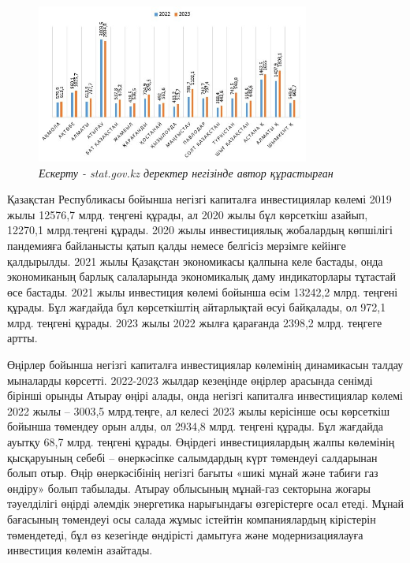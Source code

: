 \begin{figure}[H]
	\centering
	\includegraphics[width=0.8\textwidth]{media/ekon/image1.3}
	\caption*{2 -- сурет. 2022-2023 жж. ҚР өңірлері бойынша негізгі капиталға
	инвестициялар көлемінің серпіні, млрд. теңге}
	\caption*{{\normalfont \emph{Ескерту - stat.gov.kz деректер негізінде автор құрастырған}}}
\end{figure}

\begin{multicols}{2}
Қазақстан Республикасы бойынша негізгі капиталға инвестициялар көлемі
2019 жылы 12576,7 млрд. теңгені құрады, ал 2020 жылы бұл көрсеткіш
азайып, 12270,1 млрд.теңгені құрады. 2020 жылы инвестициялық жобалардың
көпшілігі пандемияға байланысты қатып қалды немесе белгісіз мерзімге
кейінге қалдырылды. 2021 жылы Қазақстан экономикасы қалпына келе
бастады, онда экономиканың барлық салаларында экономикалық даму
индикаторлары тұтастай өсе бастады. 2021 жылы инвестиция көлемі бойынша
өсім 13242,2 млрд. теңгені құрады. Бұл жағдайда бұл көрсеткіштің
айтарлықтай өсуі байқалады, ол 972,1 млрд. теңгені құрады. 2023 жылы
2022 жылға қарағанда 2398,2 млрд. теңгеге артты.

Өңірлер бойынша негізгі капиталға инвестициялар көлемінің динамикасын
талдау мыналарды көрсетті. 2022-2023 жылдар кезеңінде өңірлер арасында
сенімді бірінші орынды Атырау өңірі алады, онда негізгі капиталға
инвестициялар көлемі 2022 жылы -- 3003,5 млрд.теңге, ал келесі 2023 жылы
керісінше осы көрсеткіш бойынша төмендеу орын алды, ол 2934,8 млрд.
теңгені құрады. Бұл жағдайда ауытқу 68,7 млрд. теңгені құрады. Өңірдегі
инвестициялардың жалпы көлемінің қысқаруының себебі -- өнеркәсіпке
салымдардың күрт төмендеуі салдарынан болып отыр. Өңір өнеркәсібінің
негізгі бағыты «шикі мұнай және табиғи газ өндіру» болып табылады.
Атырау облысының мұнай-газ секторына жоғары тәуелділігі өңірді әлемдік
энергетика нарығындағы өзгерістерге осал етеді. Мұнай бағасының
төмендеуі осы салада жұмыс істейтін компаниялардың кірістерін
төмендетеді, бұл өз кезегінде өндірісті дамытуға және модернизациялауға
инвестиция көлемін азайтады.
\end{multicols}

